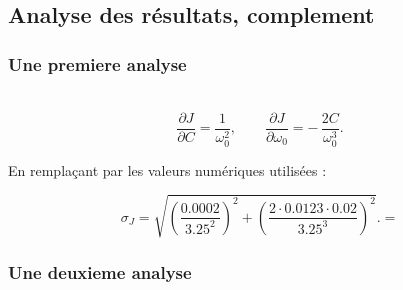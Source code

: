 \subsection{Analyse des résultats, complement}

\subsubsection{Une premiere analyse}


\\


\[
\frac{\partial J}{\partial C} = \frac{1}{\omega_0^2},
\qquad
\frac{\partial J}{\partial \omega_0}
= -\,\frac{2C}{\omega_0^3}.
\]

En remplaçant par les valeurs numériques utilisées :

\[
\sigma_J = 
\sqrt{
\left( \frac{0.0002}{3.25^2} \right)^2
+
\left( \frac{2 \cdot 0.0123 \cdot 0.02}{3.25^3} \right)^2
}.
 = \]


\subsubsection{Une deuxieme analyse}

